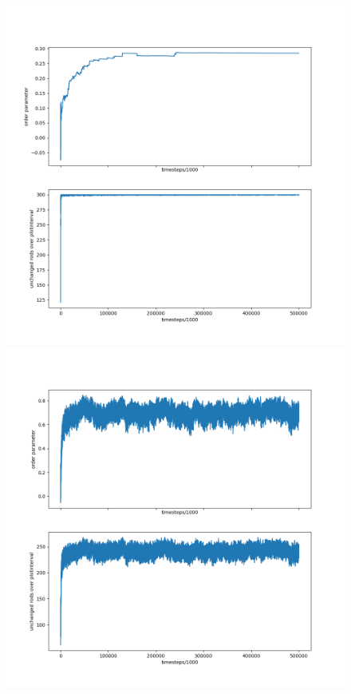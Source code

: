 \begin{figure}
  \begin{minipage}[t]{0.45\textwidth}
    \hspace{-0.1\textwidth}
    \includegraphics[width=1.2\textwidth]{data/sca_comp2_L.png}
  \end{minipage}
  \hfill
  \begin{minipage}[t]{0.45\textwidth}
    \includegraphics[width=1.2\textwidth]{data/sca_comp2_R.png}

\end{minipage}
\end{figure}
